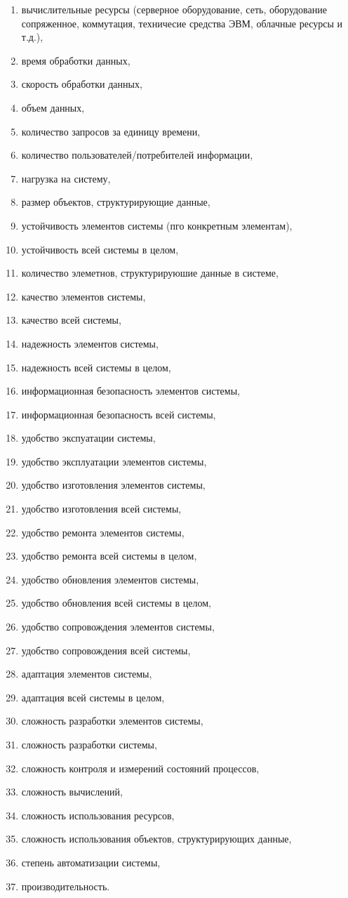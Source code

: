 \begin{enumerate}
	\item вычислительные ресурсы (серверное оборудование, сеть, оборудование сопряженное, коммутация, техничесие средства ЭВМ, облачные ресурсы и т.д.),
	\item время обработки данных,
	\item скорость обработки данных,
	\item объем данных,
	\item количество запросов за единицу времени,
	\item количество пользователей/потребителей информации,
	\item нагрузка на систему,
	\item размер объектов, структурирующие данные,
	\item устойчивость элементов системы (пго конкретным элементам),
	\item устойчивость всей системы в целом,
	\item количество элеметнов, структурируюшие данные в системе,
	\item качество элементов системы,
	\item качество всей системы,
	\item надежность элементов системы,
	\item надежность всей системы в целом,
	\item информационная безопасность элементов системы,
	\item информационная безопасность всей системы,
	\item удобство экспуатации системы,
	\item удобство эксплуатации элементов системы,
	\item удобство изготовления элементов системы,
	\item удобство изготовления всей системы,
	\item удобство ремонта элементов системы,
	\item удобство ремонта всей системы в целом,
	\item удобство обновления элементов системы,
	\item удобство обновления всей системы в целом,
	\item удобство сопровождения элементов системы,
	\item удобство сопровождения всей системы,
	\item адаптация элементов системы,
	\item адаптация всей системы в целом,
	\item сложность разработки элементов системы,
	\item сложность разработки системы,
	\item сложность контроля и измерений состояний процессов,
	\item сложность вычислений,
	\item сложность использования ресурсов, 
	\item сложность использования объектов, структурирующих данные,
	\item степень автоматизации системы,
	\item производительность.
\end{enumerate}


